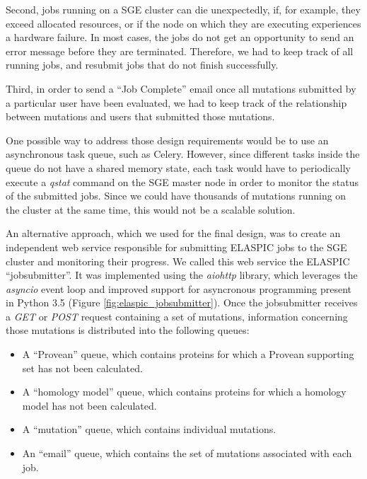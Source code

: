 Second, jobs running on a SGE cluster can die unexpectedly, if, for example, they exceed allocated resources, or if the node on which they are executing experiences a hardware failure. In most cases, the jobs do not get an opportunity to send an error message before they are terminated. Therefore, we had to keep track of all running jobs, and resubmit jobs that do not finish successfully.

Third, in order to send a ``Job Complete'' email once all mutations submitted by a particular user have been evaluated, we had to keep track of the relationship between mutations and users that submitted those mutations.

One possible way to address those design requirements would be to use an asynchronous task queue, such as Celery. However, since different tasks inside the queue do not have a shared memory state, each task would have to periodically execute a \textit{qstat} command on the SGE master node in order to monitor the status of the submitted jobs. Since we could have thousands of mutations running on the cluster at the same time, this would not be a scalable solution.

An alternative approach, which we used for the final design, was to create an independent web service responsible for submitting ELASPIC jobs to the SGE cluster and monitoring their progress. We called this web service the ELASPIC ``jobsubmitter''. It was implemented using the \textit{aiohttp} library, which leverages the \textit{asyncio} event loop and improved support for asyncronous programming present in Python 3.5 (Figure \ref{fig:elaspic_jobsubmitter}). Once the jobsubmitter receives a \textit{GET} or \textit{POST} request containing a set of mutations, information concerning those mutations is distributed into the following queues:

\vspace{-\topsep}
\begin{itemize}
	\itemsep0em
	\item A ``Provean'' queue, which contains proteins for which a Provean supporting set has not been calculated.
	\item A ``homology model'' queue, which contains proteins for which a homology model has not been calculated.
	\item A ``mutation'' queue, which contains individual mutations.
	\item An ``email'' queue, which contains the set of mutations associated with each job.
\end{itemize}

